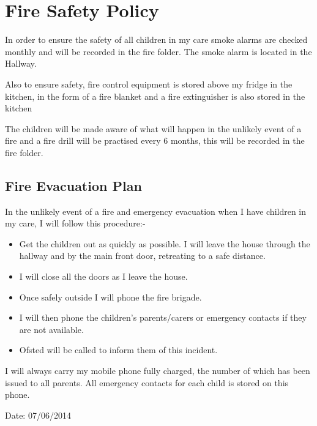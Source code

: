 \documentclass[10pt]{article}
\begin{document}
\section{Fire Safety Policy}

In order to ensure the safety of all children in my care smoke alarms
are checked monthly and will be recorded in the fire folder. The smoke
alarm is located in the Hallway.

Also to ensure safety, fire control equipment is stored above my fridge
in the kitchen, in the form of a fire blanket and a fire extinguisher is
also stored in the kitchen

The children will be made aware of what will happen in the unlikely
event of a fire and a fire drill will be practised every 6 months, this
will be recorded in the fire folder.

\subsection{Fire Evacuation Plan}

In the unlikely event of a fire and emergency evacuation when I have
children in my care, I will follow this procedure:-

\begin{itemize}
\item
  Get the children out as quickly as possible. I will leave the house
  through the hallway and by the main front door, retreating to a safe
  distance.~
\item
  I will close all the doors as I leave the house.~
\item
  Once safely outside I will phone the fire brigade. ~
\item
  I will then phone the children's parents/carers or emergency contacts
  if they are not available. ~
\item
  Ofsted will be called to inform them of this incident. ~
\end{itemize}

I will always carry my mobile phone fully charged, the number of which
has been issued to all parents. All emergency contacts for each child is
stored on this phone.

Date: 07/06/2014

~
\end{document}
